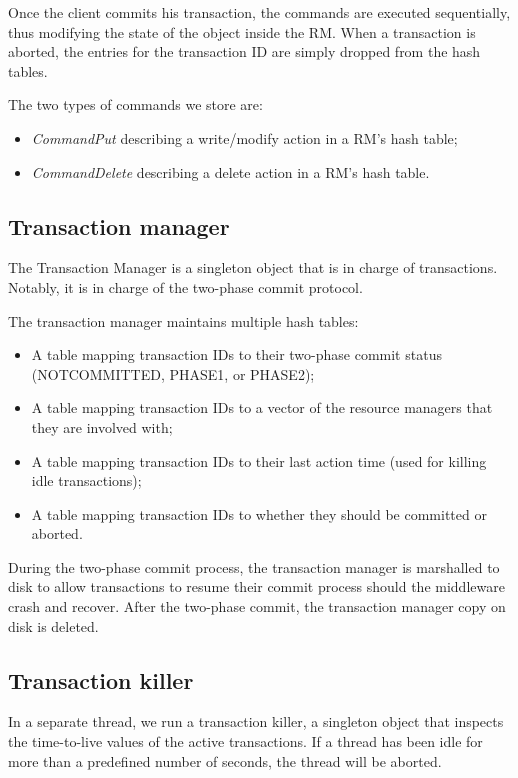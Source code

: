 \documentclass[11pt]{article}
\begin{document}
Once the client commits his transaction, the commands are executed
sequentially, thus modifying the state of the object inside the RM.
When a transaction is aborted, the entries for the transaction ID are
simply dropped from the hash tables.

The two types of commands we store are:

\begin{itemize}
\item {\it CommandPut} describing a write/modify action in a RM's hash
  table;
\item {\it CommandDelete} describing a delete action in a RM's hash
  table.
\end{itemize}

\subsection{Transaction manager}

The Transaction Manager is a singleton object that is in charge of
transactions.  Notably, it is in charge of the two-phase commit
protocol.

The transaction manager maintains multiple hash tables:

\begin{itemize}
  \item A table mapping transaction IDs to their two-phase commit
    status (NOTCOMMITTED, PHASE1, or PHASE2);
  \item A table mapping transaction IDs to a vector of the resource
    managers that they are involved with;
  \item A table mapping transaction IDs to their last action time
    (used for killing idle transactions);
  \item A table mapping transaction IDs to whether they should be
    committed or aborted.
\end{itemize}

During the two-phase commit process, the transaction manager is
marshalled to disk to allow transactions to resume their commit
process should the middleware crash and recover.  After the two-phase
commit, the transaction manager copy on disk is deleted.


\subsection{Transaction killer}

In a separate thread, we run a transaction killer, a singleton object
that inspects the time-to-live values of the active transactions.  If
a thread has been idle for more than a predefined number of seconds,
the thread will be aborted.
\end{document}

